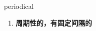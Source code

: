 
\begin{frame}
{\huge periodical}
\begin{center}
\begin{enumerate}\Large
  \item \textbf{周期性的，有固定间隔的}
\end{enumerate}
\end{center}
\end{frame}

